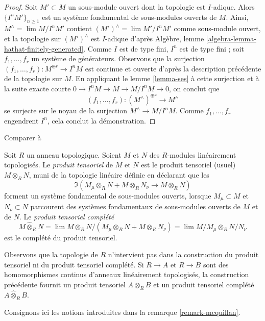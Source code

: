 \begin{proof}
Soit $M' \subset M$ un sous-module ouvert dont la topologie est $I$-adique.
Alors $\{I^nM'\}_{n \geq 1}$ est un système fondamental de sous-modules ouverts
de $M$. Ainsi, $M^\wedge = \lim M/I^nM'$ contient
$(M')^\wedge = \lim M'/I^nM'$ comme sous-module ouvert,
et la topologie sur $(M')^\wedge$ est
$I$-adique d'après Algèbre, lemme \ref{algebra-lemma-hathat-finitely-generated}.
Comme $I$ est de type fini, $I^n$ est de type fini ;
soit $f_1, \ldots, f_r$ un système de générateurs. Observons que la surjection
$(f_1, \ldots, f_r) : M^{\oplus r} \to I^n M$ est continue
et ouverte d'après la description précédente de la topologie sur $M$.
En appliquant le lemme \ref{lemma-ses} à cette surjection et à la
suite exacte courte $0 \to I^nM \to M \to M/I^nM \to 0$,
on conclut que
$$
(f_1, \ldots, f_r) :
(M^\wedge)^{\oplus r} \longrightarrow M^\wedge
$$
se surjecte sur le noyau de la surjection $M^\wedge \to M/I^nM$.
Comme $f_1, \ldots, f_r$ engendrent $I^n$, cela conclut la démonstration.
\end{proof}

\begin{definition}
\label{definition-toplogy-tensor-product}
\begin{reference}
Comparer à \cite[0, Section 7.7]{EGA}
\end{reference}
Soit $R$ un anneau topologique. Soient $M$ et $N$ des $R$-modules
linéairement topologisés. Le {\it produit tensoriel} de $M$ et $N$
est le produit tensoriel (usuel) $M \otimes_R N$, muni
de la topologie linéaire définie en déclarant que les
$$
\Im(M_\mu \otimes_R N + M \otimes_R N_\nu \longrightarrow M \otimes_R N)
$$
forment un système fondamental de sous-modules ouverts, lorsque
$M_\mu \subset M$ et $N_\nu \subset N$ parcourent des systèmes fondamentaux
de sous-modules ouverts de $M$ et de $N$.
Le {\it produit tensoriel complété}
$$
M \widehat{\otimes}_R N =
\lim M \otimes_R N/(M_\mu \otimes_R N + M \otimes_R N_\nu) =
\lim M/M_\mu \otimes_R N/N_\nu
$$
est le complété du produit tensoriel.
\end{definition}

\noindent
Observons que la topologie de $R$ n'intervient pas dans la construction
du produit tensoriel ni du produit tensoriel complété.
Si $R \to A$ et $R \to B$ sont des homomorphismes continus d'anneaux
linéairement topologisés, la construction précédente
fournit un produit tensoriel $A \otimes_R B$ et un produit
tensoriel complété $A \widehat{\otimes}_R B$.

\medskip\noindent
Consignons ici les notions introduites dans la remarque \ref{remark-mcquillan}.

